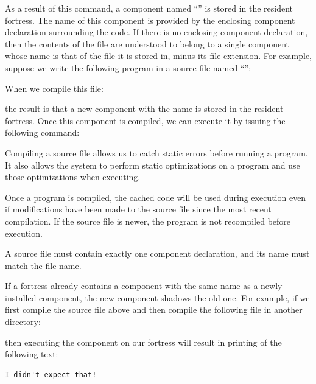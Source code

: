 \begin{itemize}
As a result of this command, a component named ``'' is stored
in the resident fortress. The name of this component is provided by
the enclosing component declaration surrounding the code. If there is
no enclosing component declaration, then the contents of the file are
understood to belong to a single component whose name is that of the
file it is stored in, minus its file extension. For example, suppose we write the
following program in a source file named ``'':


When we compile this file:


the result is that a new component with the name  is stored
in the resident fortress.
Once this component is compiled,
we can execute it by issuing
the following command:


Compiling a source file allows us to catch static errors before running a program.
It also allows the system to perform static optimizations on a program and use those
optimizations when executing.

Once a program is compiled, the cached code will be used during execution even if
modifications have been made to the source file since the most recent compilation.
If the source file is newer, the program is not recompiled before execution.

\end{itemize}

A source file must contain exactly one component declaration, and its name must
match the file name.

If a fortress already contains a component with the same name as a
newly installed component, the new component shadows the old one. For
example, if we first compile the source file 
above and then compile the following file 
in another directory:



then executing the component  on our fortress will result in
printing of the following text:

\begin{verbatim}
I didn't expect that!
\end{verbatim}

